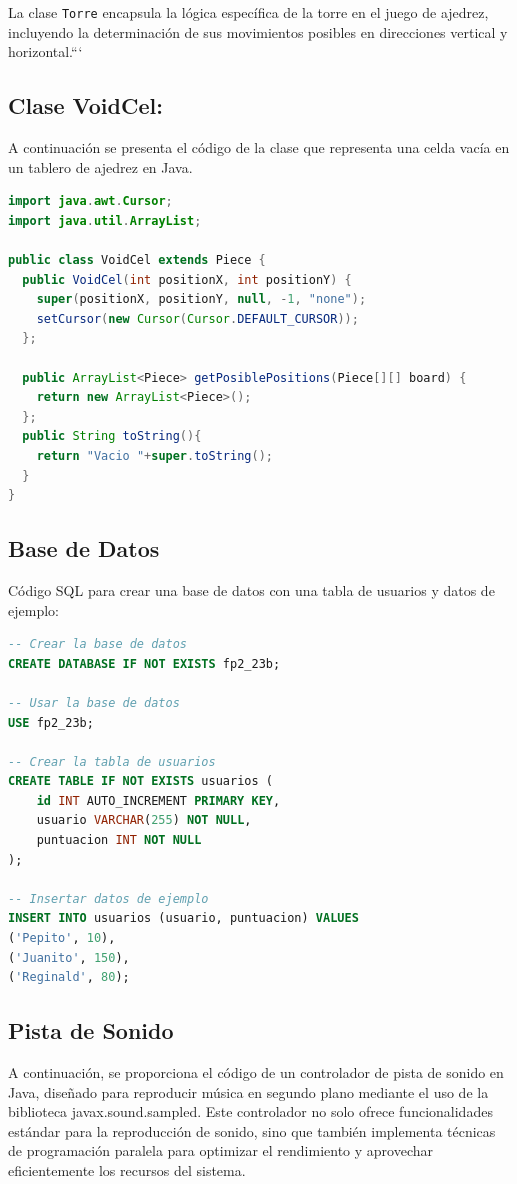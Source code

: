 \documentclass{article}
\begin{document}
La clase \texttt{Torre} encapsula la lógica específica de la torre en el juego de ajedrez, incluyendo la determinación de sus movimientos posibles en direcciones vertical y horizontal.```

\subsection{Clase VoidCel:}
A continuación se presenta el código de la clase que representa una celda vacía en un tablero de ajedrez en Java.

\begin{lstlisting}[language=java,caption={Clase VoidCel}]
import java.awt.Cursor;
import java.util.ArrayList;

public class VoidCel extends Piece {
  public VoidCel(int positionX, int positionY) {
    super(positionX, positionY, null, -1, "none");
    setCursor(new Cursor(Cursor.DEFAULT_CURSOR));
  };

  public ArrayList<Piece> getPosiblePositions(Piece[][] board) {
    return new ArrayList<Piece>();
  };
  public String toString(){
    return "Vacio "+super.toString();
  }
}
\end{lstlisting}

\subsection{Base de Datos}
Código SQL para crear una base de datos con una tabla de usuarios y datos de ejemplo:

\begin{lstlisting}[language=sql]
-- Crear la base de datos
CREATE DATABASE IF NOT EXISTS fp2_23b;

-- Usar la base de datos
USE fp2_23b;

-- Crear la tabla de usuarios
CREATE TABLE IF NOT EXISTS usuarios (
    id INT AUTO_INCREMENT PRIMARY KEY,
    usuario VARCHAR(255) NOT NULL,
    puntuacion INT NOT NULL
);

-- Insertar datos de ejemplo
INSERT INTO usuarios (usuario, puntuacion) VALUES
('Pepito', 10),
('Juanito', 150),
('Reginald', 80);
\end{lstlisting}


\subsection{Pista de Sonido}
A continuación, se proporciona el código de un controlador de pista de sonido en Java, diseñado para reproducir música en segundo plano mediante el uso de la biblioteca javax.sound.sampled. Este controlador no solo ofrece funcionalidades estándar para la reproducción de sonido, sino que también implementa técnicas de programación paralela para optimizar el rendimiento y aprovechar eficientemente los recursos del sistema.
\end{document}
